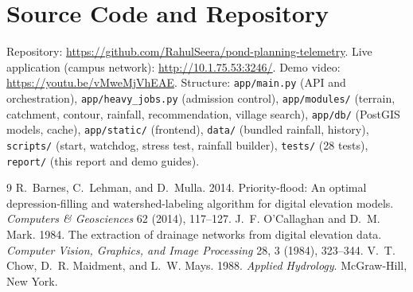 \documentclass[manuscript,screen,review]{acmart}
\begin{document}
\section{Source Code and Repository}
Repository: \url{https://github.com/RahulSeera/pond-planning-telemetry}. Live application (campus network): \url{http://10.1.75.53:3246/}. Demo video: \url{https://youtu.be/vMweMjVhEAE}. Structure: \texttt{app/main.py} (API and orchestration), \texttt{app/heavy\_jobs.py} (admission control), \texttt{app/modules/} (terrain, catchment, contour, rainfall, recommendation, village search), \texttt{app/db/} (PostGIS models, cache), \texttt{app/static/} (frontend), \texttt{data/} (bundled rainfall, history), \texttt{scripts/} (start, watchdog, stress test, rainfall builder), \texttt{tests/} (28 tests), \texttt{report/} (this report and demo guides).

\begin{thebibliography}{9}
R.~Barnes, C.~Lehman, and D.~Mulla. 2014. Priority-flood: An optimal depression-filling and watershed-labeling algorithm for digital elevation models. \emph{Computers \& Geosciences} 62 (2014), 117--127.
J.~F. O'Callaghan and D.~M. Mark. 1984. The extraction of drainage networks from digital elevation data. \emph{Computer Vision, Graphics, and Image Processing} 28, 3 (1984), 323--344.
V.~T. Chow, D.~R. Maidment, and L.~W. Mays. 1988. \emph{Applied Hydrology}. McGraw-Hill, New York.
\end{thebibliography}
\end{document}
